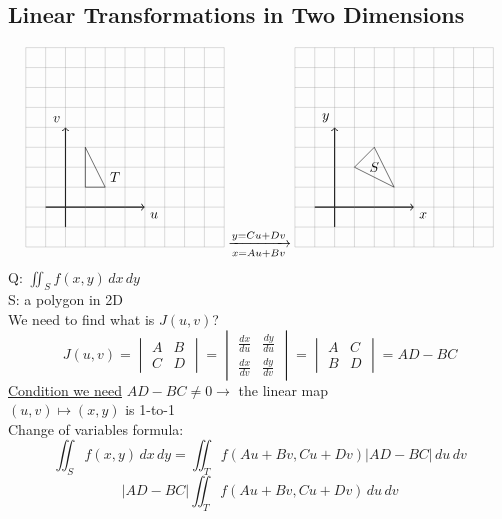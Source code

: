 \documentclass[12pt]{article}
\begin{document}
\subsection*{Linear Transformations in Two Dimensions}
    \[
        \begin{tikzpicture}[scale=0.5]
            \draw[thick,->] (-1,0) -- (4,0) node[anchor=north west] {$u$};
            \draw[thick,->] (0,-1) -- (0,4) node[anchor=south east] {$v$};
            \draw[step=1cm,gray,very thin] (-2,-2) grid (8,8);
            \draw (1, 1) -- (2,1) -- (1,3) -- cycle;
            \draw (2.5,2) node[anchor=north]{$T$};
        \end{tikzpicture}
        \xrightarrow[x=Au+Bv]{y=Cu+Dv}
        \begin{tikzpicture}[scale=0.5]
            \draw[thick,->] (-1,0) -- (4,0) node[anchor=north west] {$x$};
            \draw[thick,->] (0,-1) -- (0,4) node[anchor=south east] {$y$};
            \draw[step=1cm,gray,very thin] (-2,-2) grid (8,8);
            \draw (1, 2) -- (3,1) -- (2,3) -- cycle;
            \draw (2,2.5) node[anchor=north]{$S$};
        \end{tikzpicture}
    \]
    Q: $\iint_Sf(x,y)\,dx\,dy$ \\
    S: a polygon in 2D \\
    We need to find what is $J(u,v)$? \\
    \[
        J(u,v)=
        \begin{vmatrix}
            A & B \\
            C & D
        \end{vmatrix}    
        =
        \begin{vmatrix}
            \frac{dx}{du} & \frac{dy}{du} \\
            \frac{dx}{dv} & \frac{dy}{dv}
        \end{vmatrix}
        =
        \begin{vmatrix}
            A & C \\
            B & D
        \end{vmatrix}
        = AD-BC
    \]
    \underline{Condition we need} $AD-BC\neq 0\rightarrow$ the linear map \\
    $(u,v)\mapsto (x,y)$ is 1-to-1 \\
    Change of variables formula: \\
    \[ \iint_Sf(x,y)\,dx\,dy=\iint_Tf(Au+Bv,Cu+Dv)|AD-BC|\,du\,dv \]
    \[ |AD-BC|\iint_Tf(Au+Bv,Cu+Dv)\,du\,dv \]
\end{document}
